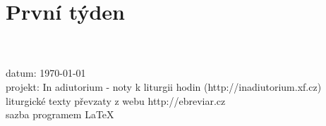\documentclass[12pt, twoside, a4paper]{article}
\newcommand{\cervene}[1]{%
  \textcolor{BrickRed}{#1}}
\newcommand{\nadpisTyden}[1]{%
  {\textsc{\Large \cervene{#1}}}}
\begin{document}
\section{První týden}

  

\\
\\
\noindent datum: \today \\
projekt: In adiutorium - noty k liturgii hodin (http://inadiutorium.xf.cz)\\
liturgické texty převzaty z webu http://ebreviar.cz\\
sazba programem \LaTeX
\end{document}
